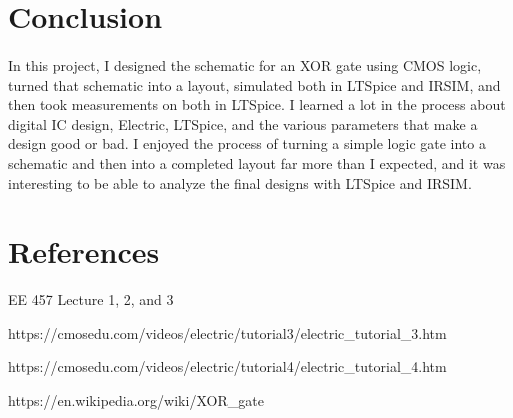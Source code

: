 \documentclass{article}
\begin{document}
\section{Conclusion}
  \paragraph{}
  In this project, I designed the schematic for an XOR gate using CMOS logic, turned that schematic into a layout, simulated both in LTSpice and IRSIM, and then took measurements on both in LTSpice. I learned a lot in the process about digital IC design, Electric, LTSpice, and the various parameters that make a design good or bad. I enjoyed the process of turning a simple logic gate into a schematic and then into a completed layout far more than I expected, and it was interesting to be able to analyze the final designs with LTSpice and IRSIM. 

\newpage
\section{References}

\noindent [\text{1}] EE 457 Lecture 1, 2, and 3

\noindent [\text{2}] https://cmosedu.com/videos/electric/tutorial3/electric\_tutorial\_3.htm 

\noindent [\text{3}] https://cmosedu.com/videos/electric/tutorial4/electric\_tutorial\_4.htm 

\noindent [\text{4}] https://en.wikipedia.org/wiki/XOR\_gate 

\end{document}
